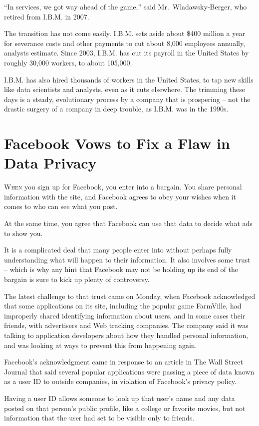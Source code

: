 ﻿\documentclass[12pt]{article}
\begin{document}
``In services, we got way ahead of the game,'' said Mr.~Wladawsky-Berger, who retired from I.B.M. in
2007.

The transition has not come easily. I.B.M. sets aside about \$400 million a year for severance costs
and other payments to cut about 8,000 employees annually, analysts estimate. Since 2003, I.B.M. has
cut its payroll in the United States by roughly 30,000 workers, to about 105,000.

I.B.M. has also hired thousands of workers in the United States, to tap new skills like data
scientists and analysts, even as it cuts elsewhere. The trimming these days is a steady,
evolutionary process by a company that is prospering -- not the drastic surgery of a company in deep
trouble, as I.B.M. was in the 1990s.

\section{Facebook Vows to Fix a Flaw in Data Privacy}

\lettrine{W}{hen} you sign up for Facebook, you enter into a bargain. You
share personal information with the site, and Facebook agrees to obey your wishes when it comes to
who can see what you post.

At the same time, you agree that Facebook can use that data to decide what ads to show you.

It is a complicated deal that many people enter into without perhaps fully understanding what will
happen to their information. It also involves some trust -- which is why any hint that Facebook may
not be holding up its end of the bargain is sure to kick up plenty of controversy.

The latest challenge to that trust came on Monday, when Facebook acknowledged that some applications
on its site, including the popular game FarmVille, had improperly shared identifying information
about users, and in some cases their friends, with advertisers and Web tracking companies. The
company said it was talking to application developers about how they handled personal information,
and was looking at ways to prevent this from happening again.

Facebook's acknowledgment came in response to an article in The Wall Street Journal that said
several popular applications were passing a piece of data known as a user ID to outside companies,
in violation of Facebook's privacy policy.

Having a user ID allows someone to look up that user's name and any data posted on that person's
public profile, like a college or favorite movies, but not information that the user had set to be
visible only to friends.
\end{document}
